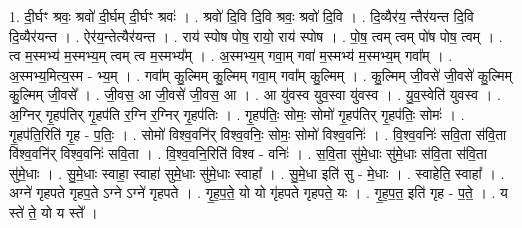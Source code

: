 \documentclass[17pt]{extarticle}
\begin{document}
1. दी॒र्घꣳ श्रवः॒ श्रवो॑ दी॒र्घम् दी॒र्घꣳ श्रवः॑ । . श्रवो॑ दि॒वि दि॒वि श्रवः॒ श्रवो॑ दि॒वि । . दि॒व्यैर॑य॒ न्तैर॑यन्त दि॒वि दि॒व्यैर॑यन्त । . ऐर॑य॒न्तेत्यैर॑यन्त । . राय॑ स्पोष पोष॒ रायो॒ राय॑ स्पोष । . पो॒ष॒ त्वम् त्वम् पो॑ष पोष॒ त्वम् । . त्व म॒स्मभ्य॑ म॒स्मभ्य॒म् त्वम् त्व म॒स्मभ्य᳚म् । . अ॒स्मभ्य॒म् गवा॒म् गवा॑ म॒स्मभ्य॑ म॒स्मभ्य॒म् गवा᳚म् । . अ॒स्मभ्य॒मित्य॒स्म - भ्य॒म् । . गवा᳚म् कु॒ल्मिम् कु॒ल्मिम् गवा॒म् गवा᳚म् कु॒ल्मिम् । . कु॒ल्मिम् जी॒वसे॑ जी॒वसे॑ कु॒ल्मिम् कु॒ल्मिम् जी॒वसे᳚ । . जी॒वस॒ आ जी॒वसे॑ जी॒वस॒ आ । . आ यु॑वस्व युव॒स्वा यु॑वस्व । . यु॒व॒स्वेति॑ युवस्व । . अ॒ग्निर् गृ॒हप॑तिर् गृ॒हप॑ति र॒ग्नि र॒ग्निर् गृ॒हप॑तिः । . गृ॒हप॑तिः॒ सोमः॒ सोमो॑ गृ॒हप॑तिर् गृ॒हप॑तिः॒ सोमः॑ । . गृ॒हप॑ति॒रिति॑ गृ॒ह - प॒तिः॒ । . सोमो॑ विश्व॒वनि॑र् विश्व॒वनिः॒ सोमः॒ सोमो॑ विश्व॒वनिः॑ । . वि॒श्व॒वनिः॑ सवि॒ता स॑वि॒ता वि॑श्व॒वनि॑र् विश्व॒वनिः॑ सवि॒ता । . वि॒श्व॒वनि॒रिति॑ विश्व - वनिः॑ । . स॒वि॒ता सु॑मे॒धाः सु॑मे॒धाः स॑वि॒ता स॑वि॒ता सु॑मे॒धाः । . सु॒मे॒धाः स्वाहा॒ स्वाहा॑ सुमे॒धाः सु॑मे॒धाः स्वाहा᳚ । . सु॒मे॒धा इति॑ सु - मे॒धाः । . स्वाहेति॒ स्वाहा᳚ । . अग्ने॑ गृहपते गृहप॒ते ऽग्ने ऽग्ने॑ गृहपते । . गृ॒ह॒प॒ते॒ यो यो गृ॑हपते गृहपते॒ यः । . गृ॒ह॒प॒त॒ इति॑ गृह - प॒ते॒ । . य स्ते॑ ते॒ यो य स्ते᳚ । \newline
\end{document}
